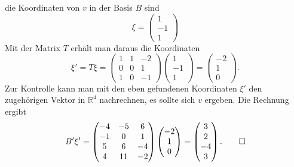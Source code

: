 \begin{loesung}
die Koordinaten von $v$ in der Basis $B$ sind 
\[
\xi
=
\begin{pmatrix}
1\\-1\\1
\end{pmatrix}
\]
Mit der Matrix $T$ erhält man daraus die Koordinaten
\[
\xi'=T\xi=
\begin{pmatrix}
1&1&-2\\
0&0& 1\\
1&0&-1
\end{pmatrix}
\begin{pmatrix}
1\\-1\\1
\end{pmatrix}
=
\begin{pmatrix}
-2\\1\\0
\end{pmatrix}.
\]
Zur Kontrolle kann man mit den eben gefundenen Koordinaten $\xi'$ den
zugehörigen Vektor in $\mathbb R^4$ nachrechnen, es sollte sich $v$
ergeben. Die Rechnung ergibt
\[
B'\xi'=
\begin{pmatrix}
-4&-5& 6\\
-1& 0& 1\\
 5& 6&-4\\
 4&11&-2
\end{pmatrix}
\begin{pmatrix}
-2\\1\\0
\end{pmatrix}
=
\begin{pmatrix}
3\\2\\-4\\3
\end{pmatrix}.
\qedhere
\]
\end{loesung}



